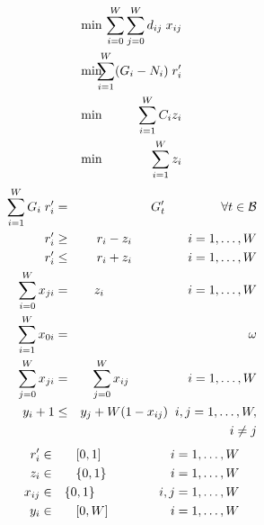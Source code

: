 \begin{eqnarray}
\min & & \hspace*{-0.5cm} \sum_{i=0}^W \sum_{j=0}^W d_{ij} \; x_{ij} \label{obj.distancia} \\
\min & & \hspace*{-0.5cm} \sum_{i=1}^W (G_i - N_i) \; r'_i \label{obj.perdida} \\
\min & & \hspace*{-0.5cm} \sum_{i=1}^W C_i z_i \label{obj.costo} \\
\min & & \hspace*{-0.5cm} \sum_{i=1}^W z_i \label{obj.cantidad} 
\end{eqnarray}
\begin{eqnarray}
\sum_{i=1}^W G_i \; r'_i & = & G'_t \hspace*{1.57cm} \forall t\in {\cal B} \label{constr.target} \\
r'_i & \ge & r_i - z_i \hspace*{1.57cm} i=1,\dots,W \label{constr.ligarrwsuperior} \\
r'_i & \le & r_i + z_i \hspace*{1.57cm} i=1,\dots,W \label{constr.ligarrwinferior} \\
\sum_{i=0}^W x_{ji} & = & z_i \hspace*{2.35cm} i = 1,\dots,W \label{constr.recorrer} \\
\sum_{i=1}^W x_{0i} & = & \omega \label{constr.salida} \\
\sum_{j=0}^W x_{ji} & = & \sum_{j=0}^W x_{ij} \hspace*{1.65cm} i=1,\dots,W \label{constr.flujo} \\
y_i + 1 & \le & y_j + W (1 - x_{ij}) \hspace*{0.2cm} i,j=1,\dots,W, \nonumber \\
        &     & \hspace*{2.65cm} i\ne j \label{constr.mtz} 
\end{eqnarray}        
\begin{eqnarray}
r'_i & \in & [0,1] \hspace*{1.95cm} i=1,\dots, W \label{constr.domrp} \\
z_i & \in & \{0,1\} \hspace*{1.8cm} i=1,\dots,W \label{constr.domz} \\
x_{ij} & \in & \{0,1\} \hspace*{1.8cm} i,j=1,\dots,W \label{constr.domx} \\
y_i & \in & [0,W] \hspace*{1.75cm} i=1,\dots,W \label{constr.domy}
\end{eqnarray}

